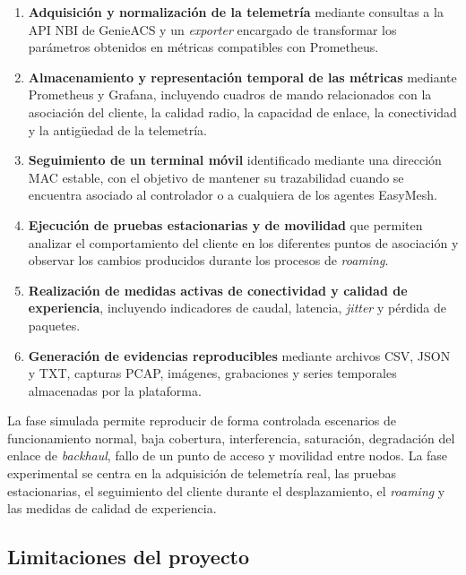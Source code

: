 \begin{enumerate}[
    label=\alph*),
    leftmargin=1.2cm,
    itemsep=0.5em,
    topsep=0.5em
]
    \item \textbf{Adquisición y normalización de la telemetría} mediante
    consultas a la API NBI de GenieACS y un \textit{exporter} encargado de
    transformar los parámetros obtenidos en métricas compatibles con
    Prometheus.

    \item \textbf{Almacenamiento y representación temporal de las
    métricas} mediante Prometheus y Grafana, incluyendo cuadros de mando
    relacionados con la asociación del cliente, la calidad radio, la
    capacidad de enlace, la conectividad y la antigüedad de la
    telemetría.

    \item \textbf{Seguimiento de un terminal móvil} identificado mediante
    una dirección MAC estable, con el objetivo de mantener su trazabilidad
    cuando se encuentra asociado al controlador o a cualquiera de los
    agentes EasyMesh.

    \item \textbf{Ejecución de pruebas estacionarias y de movilidad} que
    permiten analizar el comportamiento del cliente en los diferentes
    puntos de asociación y observar los cambios producidos durante los
    procesos de \textit{roaming}.

    \item \textbf{Realización de medidas activas de conectividad y calidad
    de experiencia}, incluyendo indicadores de caudal, latencia,
    \textit{jitter} y pérdida de paquetes.

    \item \textbf{Generación de evidencias reproducibles} mediante
    archivos CSV, JSON y TXT, capturas PCAP, imágenes, grabaciones y
    series temporales almacenadas por la plataforma.

\end{enumerate}

La fase simulada permite reproducir de forma controlada escenarios de
funcionamiento normal, baja cobertura, interferencia, saturación,
degradación del enlace de \textit{backhaul}, fallo de un punto de acceso
y movilidad entre nodos. La fase experimental se centra en la
adquisición de telemetría real, las pruebas estacionarias, el seguimiento
del cliente durante el desplazamiento, el \textit{roaming} y las medidas
de calidad de experiencia.

\subsection{Limitaciones del proyecto}
\label{subsec:limitaciones-proyecto}

